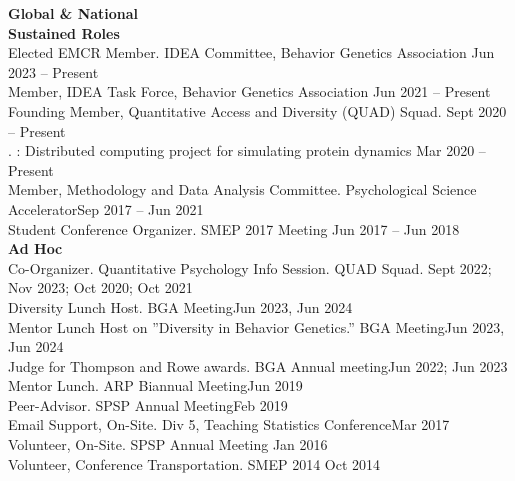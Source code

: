{\large \textbf{Global \& National}}\\
\textrm{\textbf{Sustained Roles}}\\
Elected EMCR Member. IDEA Committee, Behavior Genetics Association \hfill{Jun 2023 – Present}\\ %
Member, IDEA Task Force, Behavior Genetics Association \hfill{Jun 2021 – Present}\\
Founding Member, Quantitative Access and Diversity (QUAD) Squad. \hfill{Sept 2020 – Present}\\%
. : Distributed computing project for simulating protein dynamics \hfill{Mar 2020 – Present}\\
Member, Methodology and Data Analysis Committee. Psychological Science Accelerator\hfill{Sep 2017 – Jun 2021}\\
Student Conference Organizer. SMEP 2017 Meeting \hfill{Jun 2017 – Jun 2018}\medskip\\
\textrm{\textbf{Ad Hoc}}\\
Co-Organizer. Quantitative Psychology Info Session. QUAD Squad. \hfill{Sept 2022; Nov 2023;}\newline
\hspace*{0pt}\hfill{Oct 2020; Oct 2021}\\
Diversity Lunch Host. BGA Meeting\hfill{Jun 2023, Jun 2024}\\%
Mentor Lunch Host on ''Diversity in Behavior Genetics.'' BGA Meeting\hfill{Jun 2023, Jun 2024}\\
Judge for Thompson and Rowe awards. BGA Annual meeting\hfill{Jun 2022; Jun 2023}\\
Mentor Lunch. ARP Biannual Meeting\hfill{Jun 2019}\\
Peer-Advisor. SPSP Annual Meeting\hfill{Feb 2019}\\
Email Support, On-Site. Div 5, Teaching Statistics Conference\hfill{Mar 2017}\\
Volunteer, On-Site. SPSP Annual Meeting \hfill{Jan 2016}\\
Volunteer, Conference Transportation. SMEP 2014  \hfill{Oct 2014}\medskip\\
